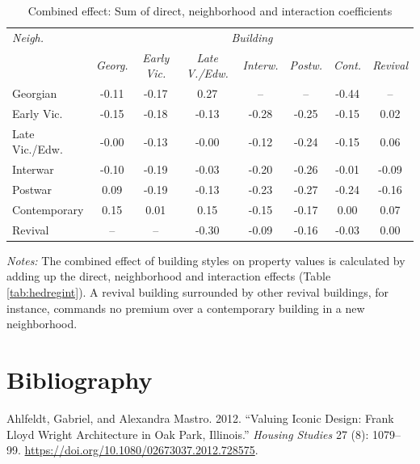 \documentclass[]{article}
\begin{document}
\begin{table}[ht]
\centering
\caption{Combined effect: Sum of direct, neighborhood and interaction coefficients}
\label{tab:comb}
\begin{tabular}{lccccccc}
\toprule
\emph{Neigh.} & \multicolumn{7}{c}{\emph{Building}} \\
 \cmidrule(lr){1-1}
 \cmidrule(lr){2-8}
& \emph{Georg.} & \emph{Early Vic.} & \emph{Late V./Edw.} & \emph{Interw.} & \emph{Postw.} & \emph{Cont.} & \emph{Revival} \\ 
  \cmidrule(lr){2-8}
Georgian & -0.11 & -0.17 & 0.27 & -- &--  & -0.44 &--  \\ 
  Early Vic. & -0.15 & -0.18 & -0.13 & -0.28 & -0.25 & -0.15 & 0.02 \\ 
  Late Vic./Edw. & -0.00 & -0.13 & -0.00 & -0.12 & -0.24 & -0.15 & 0.06 \\ 
  Interwar & -0.10 & -0.19 & -0.03 & -0.20 & -0.26 & -0.01 & -0.09 \\ 
  Postwar & 0.09 & -0.19 & -0.13 & -0.23 & -0.27 & -0.24 & -0.16 \\ 
  Contemporary & 0.15 & 0.01 & 0.15 & -0.15 & -0.17 & 0.00 & 0.07 \\ 
  Revival & -- & -- & -0.30 & -0.09 & -0.16 & -0.03 & 0.00 \\ 
\bottomrule
\end{tabular}
\begin{minipage}{\textwidth}
\vspace{0.25cm}
\footnotesize \emph{Notes:} The combined effect of building styles on property values is calculated by adding up the direct, neighborhood and interaction effects (Table \ref{tab:hedregint}). A revival building surrounded by other revival buildings, for instance, commands no premium over a contemporary building in a new neighborhood.
\end{minipage}
\end{table}

\clearpage

\hypertarget{bibliography}{%
\section*{Bibliography}\label{bibliography}}

\hypertarget{refs}{}
\leavevmode\hypertarget{ref-Ahlfeldt2012}{}%
Ahlfeldt, Gabriel, and Alexandra Mastro. 2012. ``Valuing Iconic Design:
Frank Lloyd Wright Architecture in Oak Park, Illinois.'' \emph{Housing
Studies} 27 (8): 1079--99.
\url{https://doi.org/10.1080/02673037.2012.728575}.
\end{document}

